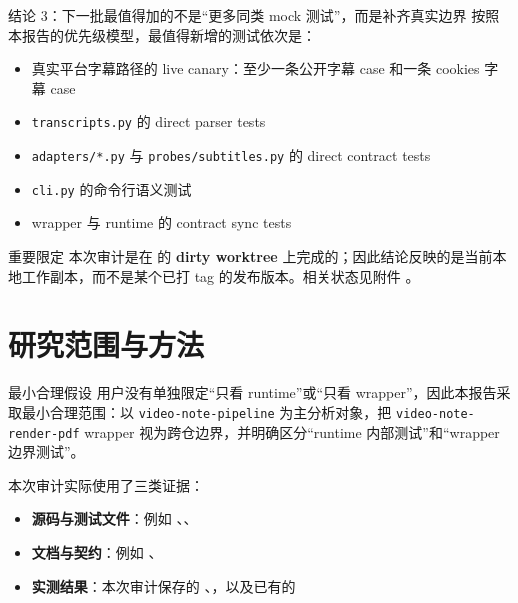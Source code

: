 \documentclass[a4paper]{article}
\begin{document}
\begin{findingbox}{结论 3：下一批最值得加的不是“更多同类 mock 测试”，而是补齐真实边界}
按照本报告的优先级模型，最值得新增的测试依次是：
\begin{itemize}
\item 真实平台字幕路径的 live canary：至少一条公开字幕 case 和一条 cookies 字幕 case
\item \texttt{transcripts.py} 的 direct parser tests
\item \texttt{adapters/*.py} 与 \texttt{probes/subtitles.py} 的 direct contract tests
\item \texttt{cli.py} 的命令行语义测试
\item wrapper 与 runtime 的 contract sync tests
\end{itemize}
\end{findingbox}

\begin{riskbox}{重要限定}
本次审计是在  的 \textbf{dirty worktree} 上完成的；因此结论反映的是当前本地工作副本，而不是某个已打 tag 的发布版本。相关状态见附件 。
\end{riskbox}

\section{研究范围与方法}

\begin{methodbox}{最小合理假设}
用户没有单独限定“只看 runtime”或“只看 wrapper”，因此本报告采取最小合理范围：以 \texttt{video-note-pipeline} 为主分析对象，把 \texttt{video-note-render-pdf} wrapper 视为跨仓边界，并明确区分“runtime 内部测试”和“wrapper 边界测试”。
\end{methodbox}

本次审计实际使用了三类证据：

\begin{itemize}
\item \textbf{源码与测试文件}：例如 、、
\item \textbf{文档与契约}：例如 、
\item \textbf{实测结果}：本次审计保存的 、，以及已有的 
\end{itemize}
\end{document}
